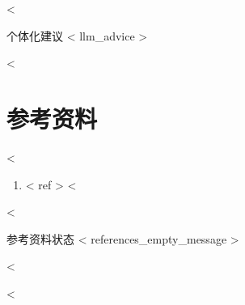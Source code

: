 <%
\begin{recommendbox}{个体化建议}
<{ llm_advice }>
\end{recommendbox}
<%

\section{参考资料}
<%
\begin{enumerate}
<%
  \item <{ ref }>
<%
\end{enumerate}
<%
\begin{infobox}{参考资料状态}
<{ references_empty_message }>
\end{infobox}
<%

<%
